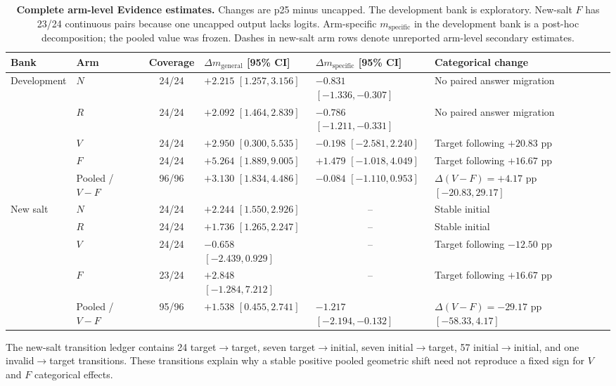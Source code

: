 \documentclass[letterpaper]{article}
\begin{document}
\begin{table}[t]
\centering
\small
\begin{tabular}{llcL{3.15cm}L{3.15cm}L{3.8cm}}
\toprule
Bank & Arm & Coverage & $\Delta m_{\mathrm{general}}$ [95\% CI] & $\Delta m_{\mathrm{specific}}$ [95\% CI] & Categorical change \\
\midrule
Development & $N$ & 24/24 & $+2.215$ $[1.257,3.156]$ & $-0.831$ $[-1.336,-0.307]$ & No paired answer migration \\
& $R$ & 24/24 & $+2.092$ $[1.464,2.839]$ & $-0.786$ $[-1.211,-0.331]$ & No paired answer migration \\
& $V$ & 24/24 & $+2.950$ $[0.300,5.535]$ & $-0.198$ $[-2.581,2.240]$ & Target following $+20.83$ pp \\
& $F$ & 24/24 & $+5.264$ $[1.889,9.005]$ & $+1.479$ $[-1.018,4.049]$ & Target following $+16.67$ pp \\
& Pooled / $V-F$ & 96/96 & $+3.130$ $[1.834,4.486]$ & $-0.084$ $[-1.110,0.953]$ & $\Delta(V-F)=+4.17$ pp $[-20.83,29.17]$ \\
\midrule
New salt & $N$ & 24/24 & $+2.244$ $[1.550,2.926]$ &  & Stable initial \\
& $R$ & 24/24 & $+1.736$ $[1.265,2.247]$ &  & Stable initial \\
& $V$ & 24/24 & $-0.658$ $[-2.439,0.929]$ &  & Target following $-12.50$ pp \\
& $F$ & 23/24 & $+2.848$ $[-1.284,7.212]$ &  & Target following $+16.67$ pp \\
& Pooled / $V-F$ & 95/96 & $+1.538$ $[0.455,2.741]$ & $-1.217$ $[-2.194,-0.132]$ & $\Delta(V-F)=-29.17$ pp $[-58.33,4.17]$ \\
\bottomrule
\end{tabular}
\caption{\textbf{Complete arm-level Evidence estimates.} Changes are p25 minus uncapped.  The development bank is exploratory.  New-salt $F$ has 23/24 continuous pairs because one uncapped output lacks logits.  Arm-specific $m_{\mathrm{specific}}$ in the development bank is a post-hoc decomposition; the pooled value was frozen.  Dashes in new-salt arm rows denote unreported arm-level secondary estimates.}
\label{tab:supp-evidence}
\end{table}

The new-salt transition ledger contains 24 target$\rightarrow$target, seven target$\rightarrow$initial, seven initial$\rightarrow$target, 57 initial$\rightarrow$initial, and one invalid$\rightarrow$target transitions.  These transitions explain why a stable positive pooled geometric shift need not reproduce a fixed sign for $V$ and $F$ categorical effects.
\end{document}
